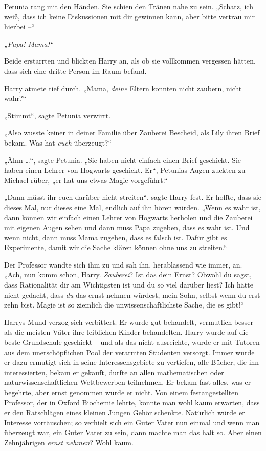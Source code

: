 {Petunia rang mit den Händen. Sie schien den Tränen nahe zu sein. „Schatz, ich weiß, dass ich keine Diskussionen mit dir gewinnen kann, aber bitte vertrau mir hierbei --“

\emph{„Papa! Mama!“}

Beide erstarrten und blickten Harry an, als ob sie vollkommen vergessen hätten, dass sich eine dritte Person im Raum befand.

Harry atmete tief durch. „Mama, \emph{deine} Eltern konnten nicht zaubern, nicht wahr?“

„Stimmt“, sagte Petunia verwirrt.

„Also wusste keiner in deiner Familie über Zauberei Bescheid, als Lily ihren Brief bekam. Was hat \emph{euch} überzeugt?“

„Ähm …“, sagte Petunia. „Sie haben nicht einfach einen Brief geschickt. Sie haben einen Lehrer von Hogwarts geschickt. Er“, Petunias Augen zuckten zu Michael rüber, „er hat uns etwas Magie vorgeführt.“

„Dann müsst ihr euch darüber nicht streiten“, sagte Harry fest. Er hoffte, dass sie dieses Mal, nur dieses eine Mal, endlich auf ihn hören würden. „Wenn es wahr ist, dann können wir einfach einen Lehrer von Hogwarts herholen und die Zauberei mit eigenen Augen sehen und dann muss Papa zugeben, dass es wahr ist. Und wenn nicht, dann muss Mama zugeben, dass es falsch ist. Dafür gibt es Experimente, damit wir die Sache klären können ohne uns zu streiten.“

Der Professor wandte sich ihm zu und sah ihn, herablassend wie immer, an. „Ach, nun komm schon, Harry. \emph{Zauberei}? Ist das dein Ernst? Obwohl du sagst, dass Rationalität dir am Wichtigsten ist und du so viel darüber liest? Ich hätte nicht gedacht, dass \emph{du} das ernst nehmen würdest, mein Sohn, selbst wenn du erst zehn bist. Magie ist so ziemlich die unwissenschaftlichste Sache, die es gibt!“

Harrys Mund verzog sich verbittert. Er wurde gut behandelt, vermutlich besser als die meisten Väter ihre leiblichen Kinder behandelten. Harry wurde auf die beste Grundschule geschickt -- und als das nicht ausreichte, wurde er mit Tutoren aus dem unerschöpflichen Pool der verarmten Studenten versorgt. Immer wurde er dazu ermutigt sich in seine Interessensgebiete zu vertiefen, alle Bücher, die ihn interessierten, bekam er gekauft, durfte an allen mathematischen oder naturwissenschaftlichen Wettbewerben teilnehmen. Er bekam fast alles, was er begehrte, aber ernst genommen wurde er nicht. Von einem festangestellten Professor, der in Oxford Biochemie lehrte, konnte man wohl kaum erwarten, dass er den Ratschlägen eines kleinen Jungen Gehör schenkte. Natürlich würde er Interesse vortäuschen; so verhielt sich ein Guter Vater nun einmal und wenn man überzeugt war, ein Guter Vater zu sein, dann machte man das halt so. Aber einen Zehnjährigen \emph{ernst nehmen}? Wohl kaum.

}
